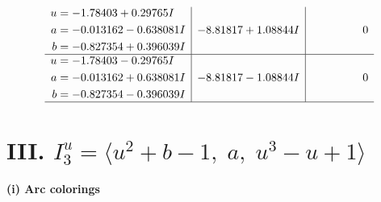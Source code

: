 \documentclass[1p]{elsarticle_modified}
\theoremstyle{definition}
\begin{document}
$$\begin{array}{c|c|c}
\begin{aligned}
u &= -1.78403 + 0.29765 I \\
a &= -0.013162 - 0.638081 I \\
b &= -0.827354 + 0.396039 I\end{aligned}
 & -8.81817 + 1.08844 I & \phantom{-0.000000 } 0 \\ \hline\begin{aligned}
u &= -1.78403 - 0.29765 I \\
a &= -0.013162 + 0.638081 I \\
b &= -0.827354 - 0.396039 I\end{aligned}
 & -8.81817 - 1.08844 I & \phantom{-0.000000 } 0\\
 \hline 
 \end{array}$$\newpage\newpage\renewcommand{\arraystretch}{1}
\centering \section*{III. $I^u_{3}= \langle u^2+b-1,\;a,\;u^3- u+1 \rangle$}
\flushleft \textbf{(i) Arc colorings}\\
\end{document}
